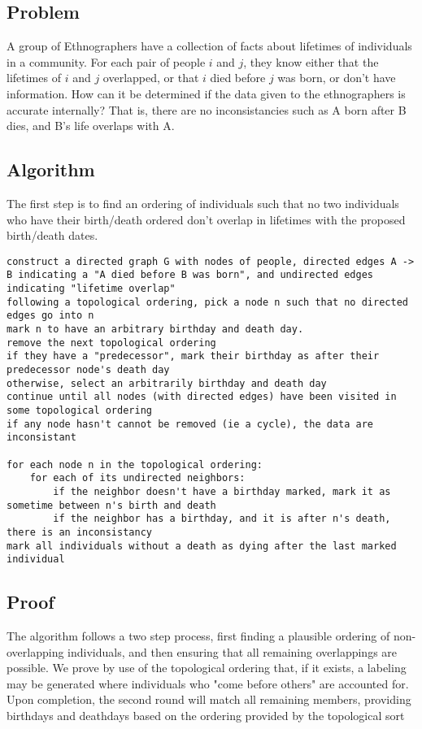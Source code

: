 \documentclass[titlepage]{article}
\numberwithin{equation}{subsection}
\begin{document}
\subsection{Problem}
A group of Ethnographers have a collection of facts about lifetimes of
individuals in a community. For each pair of people $i$ and $j$, they know
either that the lifetimes of $i$ and $j$ overlapped, or that $i$ died before
$j$ was born, or don't have information. How can it be determined if the
data given to the ethnographers is accurate internally? That is, there are
no inconsistancies such as A born after B dies, and B's life overlaps with A.
\subsection{Algorithm}
The first step is to find an ordering of individuals such that no two
individuals who have their birth/death ordered don't overlap in lifetimes with
the proposed birth/death dates.
\begin{lstlisting}
construct a directed graph G with nodes of people, directed edges A -> B indicating a "A died before B was born", and undirected edges indicating "lifetime overlap"
following a topological ordering, pick a node n such that no directed edges go into n
mark n to have an arbitrary birthday and death day.
remove the next topological ordering
if they have a "predecessor", mark their birthday as after their predecessor node's death day
otherwise, select an arbitrarily birthday and death day
continue until all nodes (with directed edges) have been visited in some topological ordering
if any node hasn't cannot be removed (ie a cycle), the data are inconsistant

for each node n in the topological ordering:
    for each of its undirected neighbors:
        if the neighbor doesn't have a birthday marked, mark it as sometime between n's birth and death
        if the neighbor has a birthday, and it is after n's death, there is an inconsistancy
mark all individuals without a death as dying after the last marked individual
\end{lstlisting}
\subsection{Proof}
The algorithm follows a two step process, first finding a plausible ordering of
non-overlapping individuals, and then ensuring that all remaining overlappings are
possible. We prove by use of the topological ordering that, if it exists,
a labeling may be generated where individuals who "come before others" are
accounted for. Upon completion, the second round will match all remaining members,
providing birthdays and deathdays based on the ordering provided by the topological
sort
\end{document}
